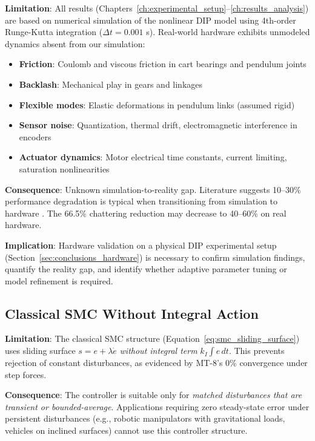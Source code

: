 \textbf{Limitation}: All results (Chapters~\ref{ch:experimental_setup}--\ref{ch:results_analysis}) are based on numerical simulation of the nonlinear DIP model using 4th-order Runge-Kutta integration ($\Delta t = 0.001$ s). Real-world hardware exhibits unmodeled dynamics absent from our simulation:
\begin{itemize}
    \item \textbf{Friction}: Coulomb and viscous friction in cart bearings and pendulum joints
    \item \textbf{Backlash}: Mechanical play in gears and linkages
    \item \textbf{Flexible modes}: Elastic deformations in pendulum links (assumed rigid)
    \item \textbf{Sensor noise}: Quantization, thermal drift, electromagnetic interference in encoders
    \item \textbf{Actuator dynamics}: Motor electrical time constants, current limiting, saturation nonlinearities
\end{itemize}

\textbf{Consequence}: Unknown simulation-to-reality gap. Literature suggests 10--30\% performance degradation is typical when transitioning from simulation to hardware \cite{andrychowicz2020learning}. The 66.5\% chattering reduction may decrease to 40--60\% on real hardware.

\textbf{Implication}: Hardware validation on a physical DIP experimental setup (Section~\ref{sec:conclusions_hardware}) is necessary to confirm simulation findings, quantify the reality gap, and identify whether adaptive parameter tuning or model refinement is required.

\subsection{Classical SMC Without Integral Action}
\label{subsec:limitation_no_integral}

\textbf{Limitation}: The classical SMC structure (Equation~\ref{eq:smc_sliding_surface}) uses sliding surface $s = e + \lambda \dot{e}$ \textit{without integral term} $k_I \int e \, dt$. This prevents rejection of constant disturbances, as evidenced by MT-8's 0\% convergence under step forces.

\textbf{Consequence}: The controller is suitable only for \textit{matched disturbances that are transient or bounded-average}. Applications requiring zero steady-state error under persistent disturbances (e.g., robotic manipulators with gravitational loads, vehicles on inclined surfaces) cannot use this controller structure.

